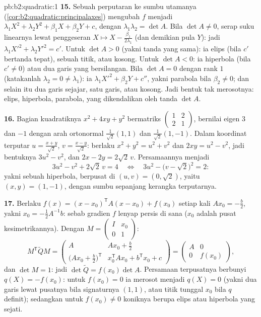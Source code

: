 \begin{solution}{pb:b2:quadratic:1}
\textbf{15.} Sebuah perputaran ke sumbu utamanya
(\cref{cor:b2:quadratic:principalaxes}) mengubah $f$ menjadi
$\lambda_1X^2 + \lambda_2Y^2 + \beta_1X + \beta_2Y + c$, dengan
$\lambda_1\lambda_2 = \det A$. Bila $\det A \neq 0$, serap
suku linearnya lewat penggeseran $X \mapsto X -
\frac{\beta_1}{2\lambda_1}$ (dan demikian pula $Y$): jadi $\lambda_1X'^2
+ \lambda_2Y'^2 = c'$. Untuk $\det A > 0$ (yakni tanda yang sama): ia
elips (bila $c'$ bertanda tepat), sebuah titik, atau kosong. Untuk $\det
A < 0$: ia hiperbola (bila $c' \neq 0$) atau dua garis yang bersilangan. Bila
$\det A = 0$ dengan rank $1$ (katakanlah $\lambda_2 = 0 \neq
\lambda_1$): ia $\lambda_1X'^2 + \beta_2Y + c''$, yakni parabola bila
$\beta_2 \neq 0$; dan selain itu dua garis sejajar, satu garis, atau
kosong. Jadi bentuk tak merosotnya: elips, hiperbola, parabola,
yang dikendalikan oleh tanda $\det A$.

\textbf{16.} Bagian kuadratiknya $x^2 + 4xy + y^2$ bermatriks
$\begin{pmatrix}1 & 2\\ 2 & 1\end{pmatrix}$, bernilai eigen $3$
dan $-1$ dengan arah ortonormal $\frac{1}{\sqrt2}(1,1)$ dan
$\frac{1}{\sqrt2}(1,-1)$. Dalam koordinat terputar $u =
\frac{x+y}{\sqrt2}$, $v = \frac{x-y}{\sqrt2}$: berlaku $x^2 + y^2 = u^2
+ v^2$ dan $2xy = u^2 - v^2$, jadi bentuknya $3u^2 - v^2$, dan $2x
- 2y = 2\sqrt2\,v$. Persamaannya menjadi
\[
3u^2 - v^2 + 2\sqrt2\,v = 4
\quad\Longleftrightarrow\quad
3u^2 - \bigl(v - \sqrt2\bigr)^2 = 2 :
\]
yakni sebuah hiperbola, berpusat di $(u, v) = (0, \sqrt2)$, yaitu $(x, y) =
(1, -1)$, dengan sumbu sepanjang kerangka terputarnya.

\textbf{17.} Berlaku $f(x) = (x - x_0)^{\mathsf T}A(x - x_0) + f(x_0)$
setiap kali $Ax_0 = -\frac b2$, yakni $x_0 = -\frac12A^{-1}b$: sebab
gradien $f$ lenyap persis di sana ($x_0$ adalah pusat
kesimetrikannya). Dengan $M = \begin{pmatrix} I & x_0\\ 0 &
1\end{pmatrix}$:
\[
M^{\mathsf T}\widetilde QM
= \begin{pmatrix}
A & Ax_0 + \frac b2\\[2pt]
\bigl(Ax_0 + \frac b2\bigr)^{\mathsf T} &
x_0^{\mathsf T}Ax_0 + b^{\mathsf T}x_0 + c
\end{pmatrix}
= \begin{pmatrix} A & 0\\ 0 & f(x_0)\end{pmatrix},
\]
dan $\det M = 1$: jadi $\det\widetilde Q = f(x_0)\det A$. Persamaan
terpusatnya berbunyi $q(X) = -f(x_0)$: untuk $f(x_0) = 0$ ia
merosot menjadi $q(X) = 0$ (yakni dua garis lewat pusatnya bila
signaturnya $(1,1)$, atau titik tunggal $x_0$ bila $q$
definit); sedangkan untuk $f(x_0) \neq 0$ koniknya berupa elips
atau hiperbola yang sejati.


\end{solution}
